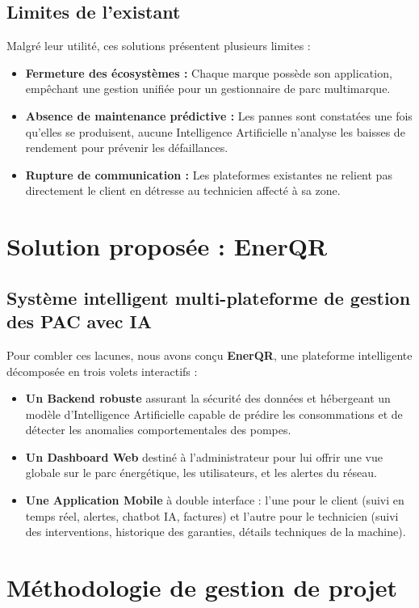 \documentclass[12pt,a4paper]{report}
\begin{document}
\subsection{Limites de l'existant}
Malgré leur utilité, ces solutions présentent plusieurs limites :
\begin{itemize}
    \item \textbf{Fermeture des écosystèmes :} Chaque marque possède son application, empêchant une gestion unifiée pour un gestionnaire de parc multimarque.
    \item \textbf{Absence de maintenance prédictive :} Les pannes sont constatées une fois qu'elles se produisent, aucune Intelligence Artificielle n'analyse les baisses de rendement pour prévenir les défaillances.
    \item \textbf{Rupture de communication :} Les plateformes existantes ne relient pas directement le client en détresse au technicien affecté à sa zone.
\end{itemize}

\section{Solution proposée : EnerQR}
\subsection{Système intelligent multi-plateforme de gestion des PAC avec IA}
Pour combler ces lacunes, nous avons conçu \textbf{EnerQR}, une plateforme intelligente décomposée en trois volets interactifs :
\begin{itemize}
    \item \textbf{Un Backend robuste} assurant la sécurité des données et hébergeant un modèle d'Intelligence Artificielle capable de prédire les consommations et de détecter les anomalies comportementales des pompes.
    \item \textbf{Un Dashboard Web} destiné à l'administrateur pour lui offrir une vue globale sur le parc énergétique, les utilisateurs, et les alertes du réseau.
    \item \textbf{Une Application Mobile} à double interface : l'une pour le client (suivi en temps réel, alertes, chatbot IA, factures) et l'autre pour le technicien (suivi des interventions, historique des garanties, détails techniques de la machine).
\end{itemize}

\section{Méthodologie de gestion de projet}
\end{document}
